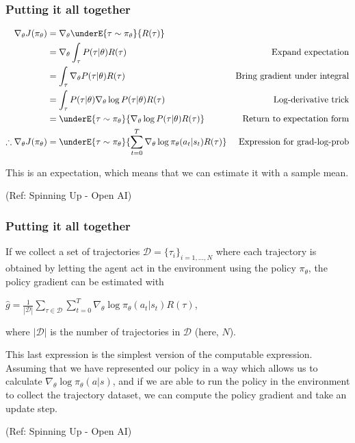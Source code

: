 \begin{frame}[fragile]\frametitle{Putting it all together}

\begin{align*}
\nabla_{\theta} J(\pi_{\theta}) &= \nabla_{\theta} \underE{\tau \sim \pi_{\theta}}{R(\tau)} & \\
&= \nabla_{\theta} \int_{\tau} P(\tau|\theta) R(\tau) & \text{Expand expectation} \\
&= \int_{\tau} \nabla_{\theta} P(\tau|\theta) R(\tau) & \text{Bring gradient under integral} \\
&= \int_{\tau} P(\tau|\theta) \nabla_{\theta} \log P(\tau|\theta) R(\tau) & \text{Log-derivative trick} \\
&= \underE{\tau \sim \pi_{\theta}}{\nabla_{\theta} \log P(\tau|\theta) R(\tau)} & \text{Return to expectation form} \\
\therefore \nabla_{\theta} J(\pi_{\theta}) &= \underE{\tau \sim \pi_{\theta}}{\sum_{t=0}^{T} \nabla_{\theta} \log \pi_{\theta}(a_t |s_t) R(\tau)} & \text{Expression for grad-log-prob}
\end{align*}

This is an expectation, which means that we can estimate it with a sample mean.


{\tiny (Ref: Spinning Up - Open AI)}
\end{frame}

\begin{frame}[fragile]\frametitle{Putting it all together}

If we collect a set of trajectories $\mathcal{D} = \{\tau_i\}_{i=1,...,N}$ where each trajectory is obtained by letting the agent act in the environment using the policy $\pi_{\theta}$, the policy gradient can be estimated with

$\hat{g} = \frac{1}{|\mathcal{D}|} \sum_{\tau \in \mathcal{D}} \sum_{t=0}^{T} \nabla_{\theta} \log \pi_{\theta}(a_t |s_t) R(\tau)$,

where $|\mathcal{D}|$ is the number of trajectories in $\mathcal{D}$ (here, $N$).

This last expression is the simplest version of the computable expression. Assuming that we have represented our policy in a way which allows us to calculate $\nabla_{\theta} \log \pi_{\theta}(a|s)$, and if we are able to run the policy in the environment to collect the trajectory dataset, we can compute the policy gradient and take an update step.

{\tiny (Ref: Spinning Up - Open AI)}
\end{frame}



